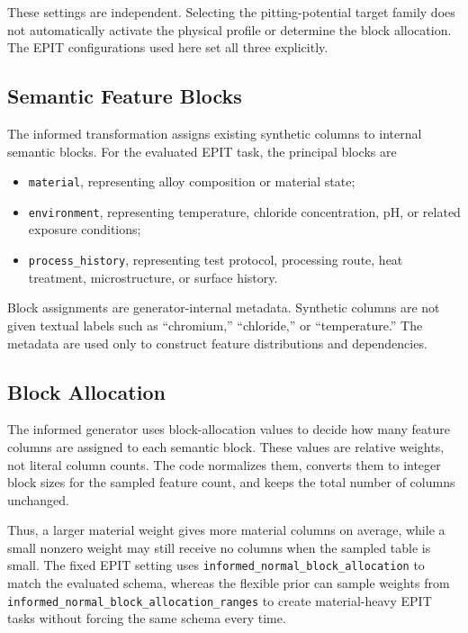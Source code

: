 \documentclass{article}
\begin{document}
These settings are independent. Selecting the pitting-potential target family does
not automatically activate the physical profile or determine the block allocation.
The EPIT configurations used here set all three explicitly.

\subsection{Semantic Feature Blocks}

The informed transformation assigns existing synthetic columns to internal semantic blocks. For the evaluated EPIT task, the principal blocks are

\begin{itemize}
    \item \texttt{material}, representing alloy composition or material state;
    \item \texttt{environment}, representing temperature, chloride concentration, pH, or related exposure conditions;
    \item \texttt{process\_history}, representing test protocol, processing route, heat treatment, microstructure, or surface history.
\end{itemize}

Block assignments are generator-internal metadata. Synthetic columns are not given textual labels such as ``chromium,'' ``chloride,'' or ``temperature.'' The metadata are used only to construct feature distributions and dependencies.

\subsection{Block Allocation}

The informed generator uses block-allocation values to decide how many feature
columns are assigned to each semantic block. These values are relative weights,
not literal column counts. The code normalizes them, converts them to integer
block sizes for the sampled feature count, and keeps the total number of columns
unchanged.

Thus, a larger material weight gives more material columns on average, while a
small nonzero weight may still receive no columns when the sampled table is small.
The fixed EPIT setting uses
\texttt{informed\_normal\_block\_allocation} to match the evaluated schema, whereas
the flexible prior can sample weights from
\texttt{informed\_normal\_block\_allocation\_ranges} to create material-heavy EPIT
tasks without forcing the same schema every time.
\end{document}
